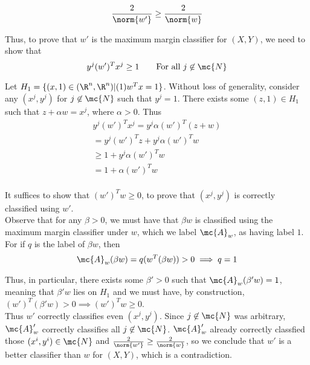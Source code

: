 \documentclass[../main.tex]{subfiles}
\begin{document}
\[
    \frac{2}{\norm{w'}} \geq \frac{2}{\norm{w}}
\]


Thus, to prove that $w'$ is the maximum margin classifier for $(X,Y)$, we need to show that \\

\[
    y^{j}(w')^Tx^{j} \geq 1 \qquad \text{For all $j \not \in \mc{N}$}
\]

Let $H_{1} = \{(x,1) \in (\R^n, \R^n) | (1)w^Tx = 1\}$. Without loss of generality, consider any $(x^{j}, y^{j})$ for $j \not \in \mc{N}$ such that $y^{j} = 1$. There exists some $(z,1) \in H_{1}$ such that $z + \alpha w = x^{j}$, where $\alpha > 0$. Thus \\

\begin{align*}
y^j(w')^Tx^j = y^j\alpha(w')^T(z + w) \\
= y^j(w')^Tz + y^j\alpha (w')^Tw \\
\geq 1 + y^j\alpha (w')^Tw \\
= 1  + \alpha(w')^Tw \\
\end{align*}

It suffices to show that $(w')^Tw \geq 0$, to prove that $(x^{j}, y^{j})$ is correctly classified using $w'$.  \\

Observe that for any $\beta > 0$, we must have that $\beta w$ is classified using the maximum margin classifier under $w$, which we label $\mc{A}_w$, as having label $1$. For if $q$ is the label of $\beta w$, then \\

\[
    \mc{A}_w(\beta w) = q(w^T(\beta w)) > 0 \implies q = 1 \\
\]

Thus, in particular, there exists some $\beta' > 0$ such that $\mc{A}_w(\beta' w) = 1$, meaning that $\beta' w$ lies on $H_1$ and we must have, by construction, $(w')^T (\beta' w) > 0 \implies (w')^Tw \geq 0$. \\

Thus $w'$ correctly classifies even $(x^{j}, y^{j})$. Since $j \not \in \mc{N}$ was arbitrary, $\mc{A}_w'$ correctly classifies all $j \not \in \mc{N}$. $\mc{A}_w'$ already correctly classfied those $(x^i,y^i) \in \mc{N}$ and $\frac{2}{\norm{w'}} \geq \frac{2}{\norm{w}}$, so we conclude that $w'$ is a better classifier than $w$ for $(X,Y)$, which is a contradiction.
\end{document}
